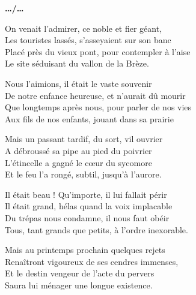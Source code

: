 \vfill

\begin{flushright}
\textbf{…/…}
\end{flushright}

\newpage

\begin{center}
\begin{minipage}{0.55\textwidth}

On venait l’admirer, ce noble et fier géant,\\
Les touristes lassés, s’asseyaient sur son banc\\
Placé près du vieux pont, pour contempler à l’aise\\
Le site séduisant du vallon de la Brèze.

\vspace{0.35cm}

Nous l’aimions, il était le vaste souvenir\\
De notre enfance heureuse, et n’aurait dû mourir\\
Que longtemps après nous, pour parler de nos vies\\
Aux fils de nos enfants, jouant dans sa prairie

\vspace{0.35cm}

Mais un passant tardif, du sort, vil ouvrier\\
A débroussé sa pipe au pied du poivrier\\
L’étincelle a gagné le cœur du sycomore\\
Et le feu l’a rongé, subtil, jusqu’à l’aurore.

\vspace{0.35cm}

Il était beau ! Qu’importe, il lui fallait périr\\
Il était grand, hélas quand la voix implacable\\
Du trépas nous condamne, il nous faut obéir\\
Tous, tant grands que petits, à l’ordre inexorable.

\vspace{0.35cm}

Mais au printemps prochain quelques rejets\\
Renaîtront vigoureux de ses cendres immenses,\\
Et le destin vengeur de l’acte du pervers\\
Saura lui ménager une longue existence.

\vspace{0.35cm}


\end{minipage}
\end{center}
